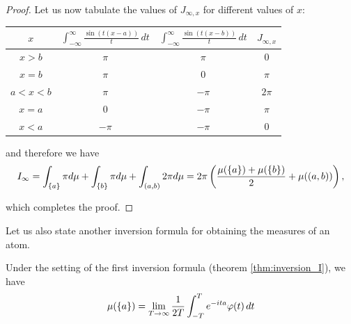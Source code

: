 \begin{proof}
Let us now tabulate the values of $J_{\infty,x}$ for different values of $x$:
\begin{table}[h]
    \centering
    \begin{tabular}{c|c|c|c}
       $x$  & $\displaystyle{\int_{-\infty}^\infty \frac{\sin(t(x-a))}{t} \, dt }$ &  $\displaystyle{\int_{-\infty}^\infty \frac{\sin(t(x-b))}{t} \, dt}$ & $J_{\infty, x}$\\
       \hline
       $x>b$ & $\pi$ & $\pi$ & 0 \\
       $x=b$ & $\pi$ & 0 & $\pi$ \\
       $a<x<b$ & $\pi$ & $-\pi$ & $2\pi$ \\
       $x=a$ & $0$ & $-\pi$ & $\pi$ \\
       $x<a$ & $-\pi$ & $-\pi$ & 0
    \end{tabular}
\end{table}

and therefore we have 
\begin{equation*}
    I_\infty = \int_{\left\{ a \right \}} \pi d\mu + \int_{\left\{ b \right \}} \pi d\mu + \int_{(a,b)} 2\pi d\mu = 2\pi \left( \frac{\mu(\left\{ a \right \}) + \mu(\left\{ b \right \})}{2} + \mu((a,b)) \right),
\end{equation*}

which completes the proof.
\end{proof}

Let us also state another inversion formula for obtaining the measures of an atom.

\begin{theorem} \label{thm:inversion_II}
Under the setting of the first inversion formula (theorem \ref{thm:inversion_I}), we have
\begin{equation}
\mu(\left\{ a \right \}) = \lim_{T\to\infty}\frac{1}{2T} \int_{-T}^T e^{-ita} \varphi(t) \, dt
\end{equation}
\end{theorem}

